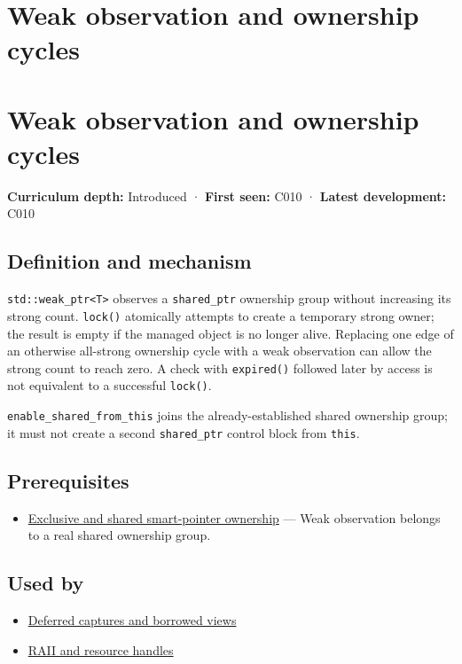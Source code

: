 \hypertarget{appendix-b9548675eb2b}{}
\section*{Weak observation and ownership cycles}
\section{Weak observation and ownership cycles}\label{weak-observation-and-ownership-cycles}

\textbf{Curriculum depth:} Introduced · \textbf{First seen:} C010 · \textbf{Latest development:} C010

\subsection{Definition and mechanism}\label{definition-and-mechanism}

\texttt{std::weak\_ptr\textless{}T\textgreater{}} observes a \texttt{shared\_ptr} ownership group without increasing its strong count. \texttt{lock()} atomically attempts to create a temporary strong owner; the result is empty if the managed object is no longer alive. Replacing one edge of an otherwise all-strong ownership cycle with a weak observation can allow the strong count to reach zero. A check with \texttt{expired()} followed later by access is not equivalent to a successful \texttt{lock()}.

\texttt{enable\_shared\_from\_this} joins the already-established shared ownership group; it must not create a second \texttt{shared\_ptr} control block from \texttt{this}.

\subsection{Prerequisites}\label{prerequisites}

\begin{itemize}
\tightlist
\item
  \hyperref[appendix-51602cabe815]{Exclusive and shared smart-pointer ownership} --- Weak observation belongs to a real shared ownership group.
\end{itemize}

\subsection{Used by}\label{used-by}

\begin{itemize}
\tightlist
\item
  \hyperref[appendix-aea529eb5175]{Deferred captures and borrowed views}
\item
  \hyperref[appendix-69739d3ab49b]{RAII and resource handles}
\end{itemize}

